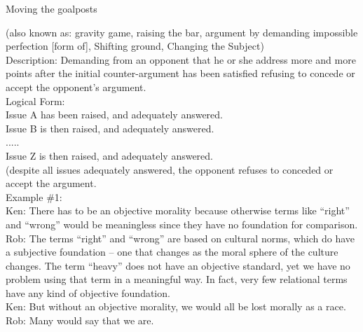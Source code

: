 \documentclass[a4paper,12pt,single,pdftex]{scrbook}
\begin{document}
  

Moving the goalposts
    
      (also known as: gravity game, raising the bar, argument by demanding impossible perfection [form of], Shifting ground, Changing the Subject)
    \\

  
    
      Description: Demanding from an opponent that he or she address more and more points after the initial counter-argument has been satisfied refusing to concede or accept the opponent’s argument.
    \\

    
      Logical Form:
    \\

    
      Issue A has been raised, and adequately answered.
    \\

    
      Issue B is then raised, and adequately answered.
    \\

    
      .....
    \\

    
      Issue Z is then raised, and adequately answered.
    \\

    
      (despite all issues adequately answered, the opponent refuses to conceded or accept the argument.
    \\

    
      Example \#1:
    \\

    
      Ken: There has to be an objective morality because otherwise terms like “right” and “wrong” would be meaningless since they have no foundation for comparison. 
    \\

    
      Rob: The terms “right” and “wrong” are based on cultural norms, which do have a subjective foundation -- one that changes as the moral sphere of the culture changes.  The term “heavy” does not have an objective standard, yet we have no problem using that term in a meaningful way.  In fact, very few relational terms have any kind of objective foundation.
    \\

    
      Ken: But without an objective morality, we would all be lost morally as a race.
    \\

    
      Rob: Many would say that we are.
    \\
\end{document}
